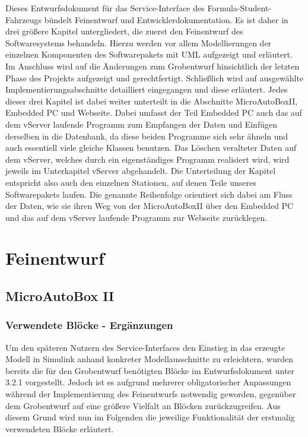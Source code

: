 \documentclass[fontsize = 12pt, paper = a4]{scrreprt}
\begin{document}
Dieses Entwurfsdokument für das Service-Interface des Formula-Student-Fahrzeugs bündelt Feinentwurf und Entwicklerdokumentation.
Es ist daher in drei größere Kapitel untergliedert, die zuerst den Feinentwurf des Softwaresystems behandeln. Hierzu werden vor allem Modellierungen der einzelnen Komponenten des Softwarepakets mit UML aufgezeigt und erläutert.
Im Anschluss wird auf die Änderungen zum Grobentwurf hinsichtlich der letzten Phase des Projekts aufgezeigt und gerechtfertigt. Schließlich wird auf ausgewählte Implementierungsabschnitte detailliert eingegangen und diese erläutert.
Jedes dieser drei Kapitel ist dabei weiter unterteilt in die Abschnitte MicroAutoBoxII, Embedded PC und Webseite. Dabei umfasst der Teil Embedded PC auch das auf dem vServer laufende Programm zum Empfangen der Daten und Einfügen derselben in die Datenbank, da diese beiden Programme sich sehr ähneln und auch essentiell viele gleiche Klassen benutzen. Das Löschen veralteter Daten auf dem vServer, welches durch ein eigenständiges Programm realisiert wird, wird jeweils im Unterkapitel vServer abgehandelt. Die Unterteilung der Kapitel entspricht also auch den einzelnen Stationen, auf denen Teile unseres Softwarepakets laufen. Die genannte Reihenfolge orientiert sich dabei am Fluss der Daten, wie sie ihren Weg von der MicroAutoBoxII über den Embedded PC und das auf dem vServer laufende Programm zur Webseite zurücklegen.


\chapter{Feinentwurf}


\section{MicroAutoBox II }
\label{MicroAutoBoxII}
\subsection{Verwendete Blöcke - Ergänzungen}

Um den späteren Nutzern des Service-Interfaces den Einstieg in das erzeugte Modell in Simulink anhand konkreter Modellausschnitte zu erleichtern, wurden bereits die für den Grobentwurf benötigten Blöcke im Entwurfsdokument unter 3.2.1 vorgestellt. Jedoch ist es aufgrund mehrerer obligatorischer Anpassungen während der Implementierung des Feinentwurfs notwendig geworden, gegenüber dem Grobentwurf auf eine größere Vielfalt an Blöcken zurückzugreifen. Aus diesem Grund wird nun im Folgenden die jeweilige Funktionalität der erstmalig verwendeten Blöcke erläutert.
\end{document}
